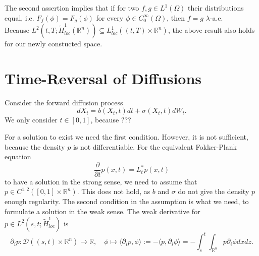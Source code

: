 \documentclass[a4paper,12pt,twoside]{article}
\begin{document}
The second assertion implies that if for two $f,g \in L^1(\Omega)$ their distributions equal, i.e. $F_f (\phi) =F_g (\phi)$ for every $\phi \in C_0^\infty (\Omega)$, then $f=g$ $\lambda$-a.e. \\
Because $L^2(t,T; \tilde{H}_{loc}^1(\mathbb{R}^n)) \subseteq L^1_{loc}( (t,T) \times \mathbb{R}^n)$, the above result also holds for our newly constucted space.




\section{Time-Reversal of Diffusions}


Consider the forward diffusion process 
\[
dX_t = b(X_t,t) dt + \sigma (X_t,t) dW_t.
\]
We only consider $t \in [0,1]$, because ???


For a solution to exist we need the first condition. However, it is not sufficient, because the density $p$ is not differentiable. For the equivalent Fokker-Plank equation 
\[
\frac{\partial}{\partial t} p (x,t) = L_t^* p(x,t)
\]
to have a solution in the strong sense, we need to assume that $p \in C^{1,2} ([0,1] \times \mathbb{R}^n)$. This does not hold, as $b$ and $\sigma$ do not give the density $p$ enough regularity. The second condition in the assumption is what we need, to formulate a solution in the weak sense. The weak derivative for $p \in L^2(s,t; \tilde{H}_{loc}^1)$ is 
 \[
    \partial_i p:  \mathcal{D}((s,t) \times \mathbb{R}^n) \to \mathbb{R}, \quad \phi \mapsto  \langle \partial_i p,\phi \rangle := - \langle p, \partial_i \phi \rangle = -\int_s^t \int_{\mathbb{R}^n} p \partial_i \phi dx dz.
    \]
\end{document}
